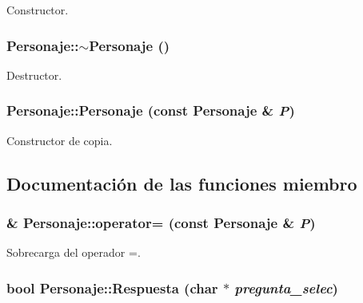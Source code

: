 Constructor. 

\hypertarget{class_personaje_0b3c25862a6081aaee96e77c08edda29}{
\subsubsection[{$\sim$Personaje}]{\setlength{\rightskip}{0pt plus 5cm}Personaje::$\sim$Personaje ()}}
\label{class_personaje_0b3c25862a6081aaee96e77c08edda29}


Destructor. 

\hypertarget{class_personaje_894a1e3daf9e5d7799e7c875c919bdb5}{
\subsubsection[{Personaje}]{\setlength{\rightskip}{0pt plus 5cm}Personaje::Personaje (const {\bf Personaje} \& {\em P})}}
\label{class_personaje_894a1e3daf9e5d7799e7c875c919bdb5}


Constructor de copia. 



\subsection{Documentación de las funciones miembro}
\hypertarget{class_personaje_c2d42e675ece1b69dbe59aa45b321774}{
\subsubsection[{operator=}]{ \& Personaje::operator= (const {\bf Personaje} \& {\em P})}}
\label{class_personaje_c2d42e675ece1b69dbe59aa45b321774}


Sobrecarga del operador =. 

\hypertarget{class_personaje_835c36dac86ff1b595dbdb3c5914b79c}{
\subsubsection[{Respuesta}]{\setlength{\rightskip}{0pt plus 5cm}bool Personaje::Respuesta (char $\ast$ {\em pregunta\_\-selec})}}
\label{class_personaje_835c36dac86ff1b595dbdb3c5914b79c}


